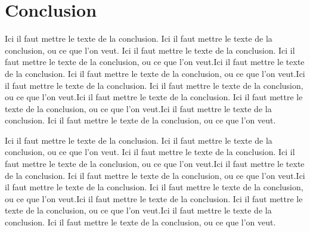 \chapter{Conclusion}

Ici il faut mettre le texte de la conclusion. Ici il faut mettre le texte de la conclusion, ou ce que l'on veut. Ici il faut mettre le texte de la conclusion. Ici il faut mettre le texte de la conclusion, ou ce que l'on veut.Ici il faut mettre le texte de la conclusion. Ici il faut mettre le texte de la conclusion, ou ce que l'on veut.Ici il faut mettre le texte de la conclusion. Ici il faut mettre le texte de la conclusion, ou ce que l'on veut.Ici il faut mettre le texte de la conclusion. Ici il faut mettre le texte de la conclusion, ou ce que l'on veut.Ici il faut mettre le texte de la conclusion. Ici il faut mettre le texte de la conclusion, ou ce que l'on veut.

Ici il faut mettre le texte de la conclusion. Ici il faut mettre le texte de la conclusion, ou ce que l'on veut. Ici il faut mettre le texte de la conclusion. Ici il faut mettre le texte de la conclusion, ou ce que l'on veut.Ici il faut mettre le texte de la conclusion. Ici il faut mettre le texte de la conclusion, ou ce que l'on veut.Ici il faut mettre le texte de la conclusion. Ici il faut mettre le texte de la conclusion, ou ce que l'on veut.Ici il faut mettre le texte de la conclusion. Ici il faut mettre le texte de la conclusion, ou ce que l'on veut.Ici il faut mettre le texte de la conclusion. Ici il faut mettre le texte de la conclusion, ou ce que l'on veut.
